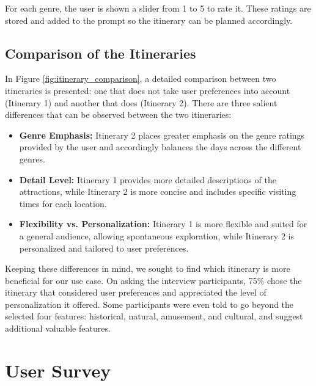 \documentclass[final,3p,times,authoryear]{elsarticle}
\begin{document}
        For each genre, the user is shown a slider from 1 to 5 to rate it. These ratings are stored and added to the prompt so the itinerary can be planned accordingly.
    
    \vspace{-7pt}
    
    \subsection{Comparison of the Itineraries}
        
        In Figure \ref{fig:itinerary_comparison}, a detailed comparison between two itineraries is presented: one that does not take user preferences into account (Itinerary 1) and another that does (Itinerary 2). There are three salient differences that can be observed between the two itineraries:
    
        \begin{itemize}[noitemsep, topsep=5pt, parsep=0pt, partopsep=0pt]
        \item \textbf{Genre Emphasis:} Itinerary 2 places greater emphasis on the genre ratings provided by the user and accordingly balances the days across the different genres.
        
        \item \textbf{Detail Level:} Itinerary 1 provides more detailed descriptions of the attractions, while Itinerary 2 is more concise and includes specific visiting times for each location.
        
        \item \textbf{Flexibility vs. Personalization:} Itinerary 1 is more flexible and suited for a general audience, allowing spontaneous exploration, while Itinerary 2 is personalized and tailored to user preferences.
        \end{itemize}
        
        Keeping these differences in mind, we sought to find which itinerary is more beneficial for our use case. On asking the interview participants, 75\% chose the itinerary that considered user preferences and appreciated the level of personalization it offered. Some participants were even told to go beyond the selected four features: historical, natural, amusement, and cultural, and suggest additional valuable features.

\vspace{-7pt}

\section{User Survey}
    
\end{document}
